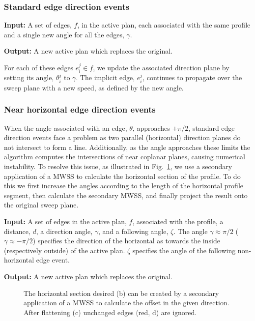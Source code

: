 \subsubsection{Standard edge direction events} {\bf Input:} A set of edges, $f$, in the active plan, each associated with the same profile and a single new angle for all the edges, $\gamma$. 

{\bf Output:} A new active plan which replaces the original.

For each of these edges $e_i^j \in f$, we update the associated direction plane by setting its angle, $\theta_i^j$ to $\gamma$. The implicit edge, $e_i^j$, continues to propagate over the sweep plane with a new speed, as defined by the new angle.

\subsubsection{Near horizontal edge direction events}

When the angle associated with an edge, $\theta$, approaches $ \pm \pi/2 $, standard edge direction events face a problem as two parallel (horizontal) direction planes do not intersect to form a line. Additionally, as the angle approaches these limits the algorithm computes the intersections of near coplanar planes, causing numerical instability. To resolve this issue, as illustrated in Fig.~\ref{fig:horiz}, we use a secondary application of a MWSS to calculate the horizontal section of the profile. To do this we first increase the angles according to the length of the horizontal profile segment, then calculate the secondary MWSS, and finally project the result onto the original sweep plane.

{\bf Input:} A set of edges in the active plan, $f$, associated with the profile, a distance, $d$, a direction angle, $\gamma$, and a following angle, $\zeta$. The angle $\gamma \approx \pi/2$ ($\gamma \approx -\pi/2$) specifies the direction of the horizontal as towards the inside (respectively outside) of the active plan. $\zeta$ specifies the angle of the following non-horizontal edge event. 

{\bf Output:} A new active plan which replaces the original.

\begin{figure}
  \centering
  \def\svgwidth{1.0\columnwidth}
  
  \caption[Near horizontal edge direction events]{\label{fig:horiz}
The horizontal section desired (b) can be created by a secondary application of a MWSS to calculate the offset in the given direction. After flattening (c) unchanged edges (red, d) are ignored.}
\end{figure}

